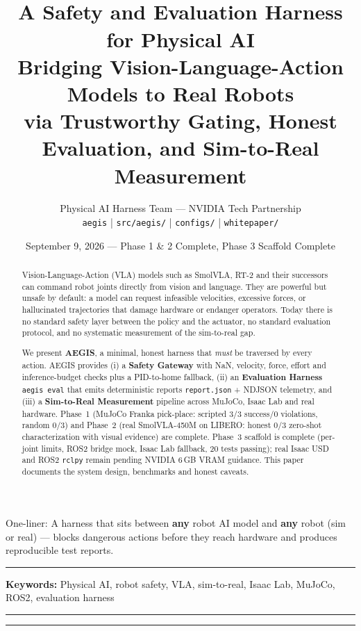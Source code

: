 \documentclass[11pt,a4paper]{article}
\title{\vspace{-6mm}{\color{aegisblue}\Huge\textbf{AEGIS}}\\[2mm]
{\Large A Safety and Evaluation Harness for Physical AI}\\[2mm]
{\normalsize Bridging Vision-Language-Action Models to Real Robots\\ via Trustworthy Gating, Honest Evaluation, and Sim-to-Real Measurement}}
\author{Physical AI Harness Team \quad — \quad NVIDIA Tech Partnership\\[1mm]
{\small \texttt{aegis} \;|\; \texttt{src/aegis/} \;|\; \texttt{configs/} \;|\; \texttt{whitepaper/}}}
\date{September 9, 2026 \quad — \quad Phase 1 \& 2 Complete, Phase 3 Scaffold Complete}
\begin{document}
\maketitle
\vspace{-6mm}
\begin{center}
\small\textcolor{aegisgray}{One-liner: A harness that sits between \textbf{any} robot AI model and \textbf{any} robot (sim or real) — blocks dangerous actions before they reach hardware and produces reproducible test reports.}
\end{center}
\vspace{2mm}
\hrule
\vspace{3mm}

\begin{abstract}
\noindent Vision-Language-Action (VLA) models such as SmolVLA, RT-2 and their successors can command robot joints directly from vision and language. They are powerful but unsafe by default: a model can request infeasible velocities, excessive forces, or hallucinated trajectories that damage hardware or endanger operators. Today there is no standard safety layer between the policy and the actuator, no standard evaluation protocol, and no systematic measurement of the sim-to-real gap.

We present \textbf{AEGIS}, a minimal, honest harness that \textit{must} be traversed by every action. AEGIS provides (i) a \textbf{Safety Gateway} with NaN, velocity, force, effort and inference-budget checks plus a PID-to-home fallback, (ii) an \textbf{Evaluation Harness} \texttt{aegis eval} that emits deterministic reports \texttt{report.json} + NDJSON telemetry, and (iii) a \textbf{Sim-to-Real Measurement} pipeline across MuJoCo, Isaac Lab and real hardware. Phase~1 (MuJoCo Franka pick-place: scripted 3/3 success/0 violations, random 0/3) and Phase~2 (real SmolVLA-450M on LIBERO: honest 0/3 zero-shot characterization with visual evidence) are complete. Phase~3 scaffold is complete (per-joint limits, ROS2 bridge mock, Isaac Lab fallback, 20 tests passing); real Isaac USD and ROS2 \texttt{rclpy} remain pending NVIDIA 6\,GB VRAM guidance. This paper documents the system design, benchmarks and honest caveats.
\end{abstract}

\vspace{1mm}
\noindent\textbf{Keywords:} Physical AI, robot safety, VLA, sim-to-real, Isaac Lab, MuJoCo, ROS2, evaluation harness
\vspace{2mm}
\hrule
\tableofcontents
\vspace{2mm}
\hrule
\end{document}
